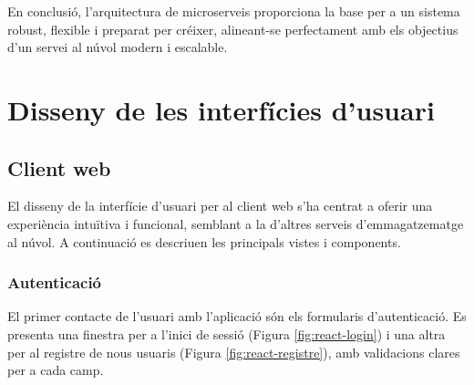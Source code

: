 En conclusió, l'arquitectura de microserveis proporciona la base per a un sistema robust, flexible i preparat per créixer, alineant-se perfectament amb els objectius d'un servei al núvol modern i escalable.

\section{Disseny de les interfícies d'usuari}

\subsection{Client web}
El disseny de la interfície d'usuari per al client web s'ha centrat a oferir una experiència intuïtiva i funcional, semblant a la d'altres serveis d'emmagatzematge al núvol. A continuació es descriuen les principals vistes i components.

\subsubsection{Autenticació}
El primer contacte de l'usuari amb l'aplicació són els formularis d'autenticació. Es presenta una finestra per a l'inici de sessió (Figura \ref{fig:react-login}) i una altra per al registre de nous usuaris (Figura \ref{fig:react-registre}), amb validacions clares per a cada camp.

